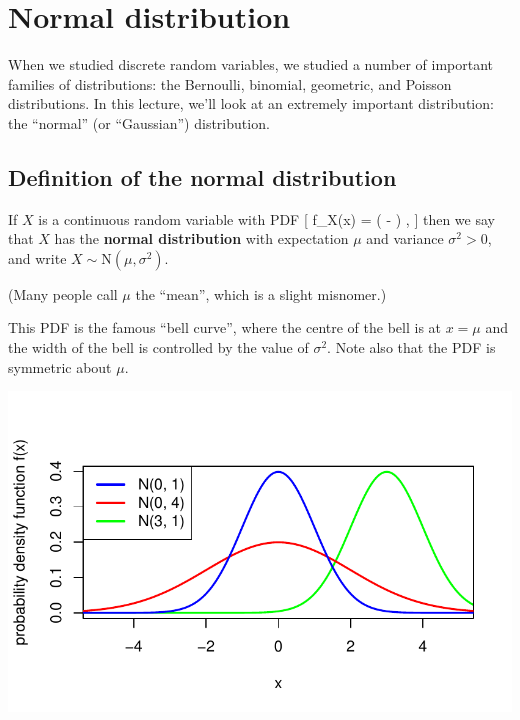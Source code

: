 \documentclass[
  letterpaper,
  DIV=11,
  numbers=noendperiod]{scrreprt}
\theoremstyle{remark}
\begin{document}
\hypertarget{L16-normal}{%
\chapter{Normal distribution}\label{L16-normal}}

When we studied discrete random variables, we studied a number of
important families of distributions: the Bernoulli, binomial, geometric,
and Poisson distributions. In this lecture, we'll look at an extremely
important distribution: the ``normal'' (or ``Gaussian'') distribution.

\hypertarget{normal-definition}{%
\section{Definition of the normal
distribution}\label{normal-definition}}

If \(X\) is a continuous random variable with PDF {[} f\_X(x) =
 \exp \left( -
 \right) , {]} then we say that \(X\) has
the \textbf{normal distribution} with expectation \(\mu\) and variance
\(\sigma^2 > 0\), and write \(X \sim \mathrm N(\mu,\sigma^2)\).

(Many people call \(\mu\) the ``mean'', which is a slight misnomer.)

This PDF is the famous ``bell curve'', where the centre of the bell is
at \(x = \mu\) and the width of the bell is controlled by the value of
\(\sigma^2\). Note also that the PDF is symmetric about \(\mu\).

\includegraphics{sections/L17-normal_files/figure-pdf/norm-pic-1-1.pdf}
\end{document}

